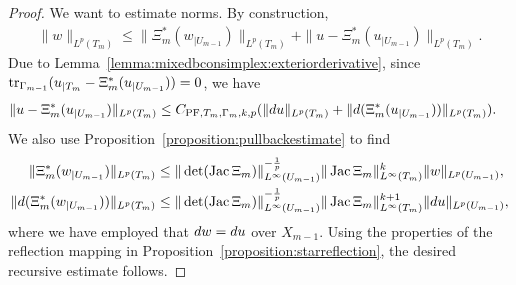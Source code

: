 \documentclass[10pt,a4paper]{article}
\begin{document}
\begin{proof}
    We want to estimate norms. 
    By construction,
    \begin{align*}
        \| w \|_{L^{p}(T_{m})}
        \leq  
        \| \Xi_{m}^{\ast}(w_{|U_{m-1}}) \|_{L^{p}(T_{m})}
        + 
        \| u - \Xi_{m}^{\ast}(u_{|U_{m-1}}) \|_{L^{p}(T_{m})}
        .
    \end{align*}
    Due to Lemma~\ref{lemma:mixedbconsimplex:exteriorderivative}, since $\operatorname{tr}_{\Gamma_{m-1}} (u_{|T_m} - \Xi_{m}^{\ast}(u_{|U_{m-1}})) = 0$, we have
    \begin{align*}
        \| u - \Xi_{m}^{\ast}(u_{|U_{m-1}}) \|_{L^{p}(T_{m})} 
        &
        \leq 
        C_{{\rm PF},T_{m},\Gamma_{m},k,p} (\| d u      \|_{L^{p}(T_{m})} 
        + \| d (\Xi_{m}^{\ast}(u_{|U_{m-1}})) \|_{L^{p}(T_{m})} )
        .
    \end{align*}
    We also use Proposition~\ref{proposition:pullbackestimate} to find 
    \begin{align*}
        \| \Xi_{m}^{\ast}(w_{|U_{m-1}}) \|_{L^{p}(T_{m})}
        &\leq 
        \|\det(\operatorname{{\rm Jac}} \Xi_{m}  )\|^{-\frac 1 p}_{L^{\infty}(U_{m-1})} 
        \| \operatorname{{\rm Jac}} \Xi_{m} \|^{k}_{L^{\infty}(T_{m})}
        \| w \|_{L^{p}(U_{m-1})}
        ,
        \\
        \| d (\Xi_{m}^{\ast}(w_{|U_{m-1}})) \|_{L^{p}(T_{m})}
        &\leq 
        \|\det(\operatorname{{\rm Jac}} \Xi_{m}  )\|^{-\frac 1 p}_{L^{\infty}(U_{m-1})} 
        \| \operatorname{{\rm Jac}} \Xi_{m} \|^{k+1}_{L^{\infty}(T_{m})}
        \| d u \|_{L^{p}(U_{m-1})}
        ,
    \end{align*}
    where we have employed that $d w = d u$ over $X_{m-1}$. 
    Using the properties of the reflection mapping in Proposition~\ref{proposition:starreflection}, the desired recursive estimate follows. 
\end{proof}
\end{document}
